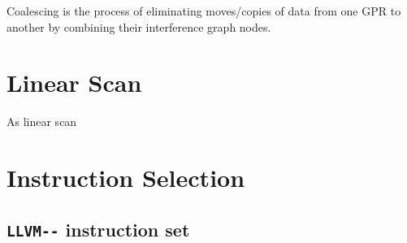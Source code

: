 \documentclass{article}
\begin{document}
Coalescing is the process of eliminating moves/copies of data from one GPR to another by combining their interference graph nodes.
\color{black}

\section{Linear Scan}







%
%
%
%
%
%

As linear scan 


\section{Instruction Selection}



\subsection{\lstinline!LLVM--! instruction set}
\end{document}
